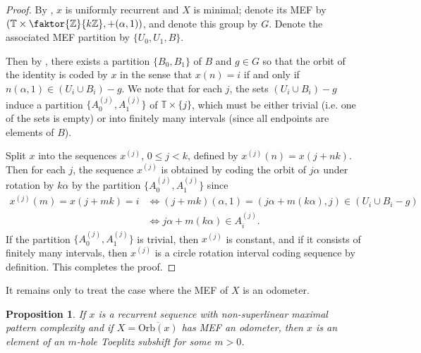 \documentclass[11pt,reqno]{amsart}
\newtheorem{proposition}[theorem]{Proposition}
\theoremstyle{definition}
\theoremstyle{plain}
\newcommand{\OO}{\mathrm{Orb}}
\newcommand{\Z}{\mathbb{Z}}
\newcommand{\N}{\mathbb{N}}
\newcommand{\AuthornoteR}[2]{{\sf\small\color{blue}{[#1: #2]}}}
\newcommand{\rp}{\AuthornoteR{R}}
\begin{document}
\begin{proof}
By , $x$ is uniformly recurrent and $X$ is minimal; denote its MEF by $\left( \mathbb{T} \times \faktor{\Z}{k\Z}, +(\alpha, 1)\right)$, and denote this group by $G$. Denote the associated MEF partition by $\{U_0, U_1, B\}$.  

Then by , there exists a partition $\{B_0, B_1\}$ of $B$ and $g \in G$ so that the orbit of the identity is coded by $x$ in the sense that $x(n) = i$ if and only if $n(\alpha, 1) \in (U_i \cup B_i) - g$. We note that for each $j$, the sets $(U_i \cup B_i) - g$ induce a partition $\{A^{(j)}_0, A^{(j)}_1\}$ of $\mathbb{T} \times \{j\}$, which must be either trivial (i.e. one of the sets is empty) or into finitely many intervals (since all endpoints are elements of $B$). 

Split $x$ into the sequences $x^{(j)}$, $0 \leq j < k$, defined by $x^{(j)}(n) = x(j + nk)$. Then for each $j$, the sequence $x^{(j)}$ is obtained by coding the orbit of $j \alpha$ under rotation by $k \alpha$ by the partition $\{A^{(j)}_0, A^{(j)}_1\}$ since
\begin{align*}
    x^{(j)}(m) = x(j + mk) = i &\Longleftrightarrow (j+mk)(\alpha,1) = (j\alpha + m(k\alpha), j) \in (U_i \cup B_i - g) \\
    &\Longleftrightarrow j\alpha + m(k \alpha) \in A^{(j)}_i.
\end{align*}
If the partition $\{A^{(j)}_0, A^{(j)}_1\}$ is trivial, then $x^{(j)}$ is constant, and if it consists of finitely many intervals, then $x^{(j)}$ is a circle rotation interval coding sequence by definition. This completes the proof.
\end{proof}

It remains only to treat the case where the MEF of $X$ is an odometer.

\begin{proposition}\label{part2}
If $x$ is a recurrent sequence with non-superlinear maximal pattern complexity and if $X = \overline{\OO(x)}$ has MEF an odometer, then $x$ is an element of an $m$-hole Toeplitz subshift for some $m > 0$. %
\end{proposition}
\end{document}
